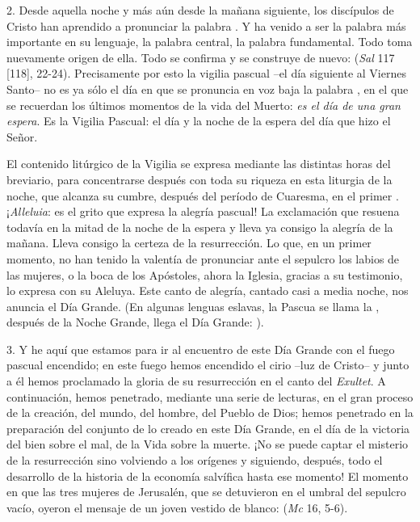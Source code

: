 \begin{body}
2. Desde aquella noche y más aún desde la mañana siguiente, los discípulos de Cristo han aprendido a pronunciar la palabra . Y ha venido a ser la palabra más importante en su lenguaje, la palabra central, la palabra fundamental. Todo toma nuevamente origen de ella. Todo se confirma y se construye de nuevo:  (\textit{Sal} 117 [118], 22-24). Precisamente por esto la vigilia pascual –el día siguiente al Viernes Santo– no es ya sólo el día en que se pronuncia en voz baja la palabra , en el que se recuerdan los últimos momentos de la vida del Muerto: \textit{es el día de una gran espera}. Es la Vigilia Pascual: el día y la noche de la espera del día que hizo el Señor.

El contenido litúrgico de la Vigilia se expresa mediante las distintas horas del breviario, para concentrarse después con toda su riqueza en esta liturgia de la noche, que alcanza su cumbre, después del período de Cuaresma, en el primer . ¡\textit{Alleluia}: es el grito que expresa la alegría pascual! La exclamación que resuena todavía en la mitad de la noche de la espera y lleva ya consigo la alegría de la mañana. Lleva consigo la certeza de la resurrección. Lo que, en un primer momento, no han tenido la valentía de pronunciar ante el sepulcro los labios de las mujeres, o la boca de los Apóstoles, ahora la Iglesia, gracias a su testimonio, lo expresa con su Aleluya. Este canto de alegría, cantado casi a media noche, nos anuncia el Día Grande. (En algunas lenguas eslavas, la Pascua se llama la , después de la Noche Grande, llega el Día Grande: ).

3. Y he aquí que estamos para ir al encuentro de este Día Grande con el fuego pascual encendido; en este fuego hemos encendido el cirio –luz de Cristo– y junto a él hemos proclamado la gloria de su resurrección en el canto del \textit{Exultet}. A continuación, hemos penetrado, mediante una serie de lecturas, en el gran proceso de la creación, del mundo, del hombre, del Pueblo de Dios; hemos penetrado en la preparación del conjunto de lo creado en este Día Grande, en el día de la victoria del bien sobre el mal, de la Vida sobre la muerte. ¡No se puede captar el misterio de la resurrección sino volviendo a los orígenes y siguiendo, después, todo el desarrollo de la historia de la economía salvífica hasta ese momento! El momento en que las tres mujeres de Jerusalén, que se detuvieron en el umbral del sepulcro vacío, oyeron el mensaje de un joven vestido de blanco:  (\textit{Mc} 16, 5-6).


\end{body}
